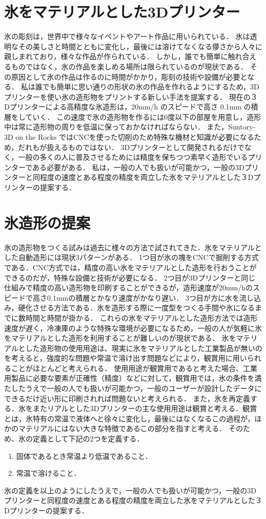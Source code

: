 \section{氷をマテリアルとした3Dプリンター}
\label{sec:paragraph}

氷の彫刻は，世界中で様々なイベントやアート作品に用いられている．
氷は透明なその美しさと時間とともに変化し，最後には溶けてなくなる儚さから人々に親しまれており，様々な作品が作られている．
しかし，誰でも簡単に触れ合えるものではなく，氷の作品を楽しめる場所は限られているのが現状である．
その原因として氷の作品は作るのに時間がかかり，彫刻の技術や設備が必要となる．
私は誰でも簡単に思い通りの形状の氷の作品を作れるようにするため，3Dプリンターを使い氷の造形物をプリントする新しい手法を提案する．
現在の３Dプリンターによる高精度な氷造形は，20mm/h のスピードで高さ 0.1mm の積層をしていく．
この速度で氷の造形物を作るには0度以下の部屋を用意し，造形中は常に造形物の周りを低温に保っておかなければならない．
また，Suntory-3D on the Rocks \cite{b} ではCNCを使った切削のため特殊な機材と知識が必要になるため，だれもが扱えるものではない．
3Dプリンターとして開発されるだけでなく，一般の多くの人に普及させるためには精度を保ちつつ素早く造形でいるプリンターである必要がある．
私は，一般の人でも扱いが可能かつ，一般の3Dプリンターと同程度の速度とある程度の精度を両立した氷をマテリアルとした３Dプリンターの提案する．

\section{氷造形の提案}
\label{sec:enum}

氷の造形物をつくる試みは過去に様々の方法で試されてきた．氷をマテリアルとした自動造形には現状3パターンがある．
1つ目が氷の塊をCNCで掘削する方式である．CNC方式では，精度の高い氷をマテリアルとした造形を行おうことができるのだが，特殊な設備と技術が必要になる．
2つ目が3Dプリンターと同じ仕組みで精度の高い造形物を印刷することができるが，造形速度が20mm/hのスピードで高さ0.1mmの積層とかなり速度がかなり遅い．
3つ目が方に水を流し込み，硬化させる方法である．氷を造形する際に一度型をつくる手間や氷になるまでに数時間と時間が掛かる．
これらの氷をマテリアルとした造形方法では造形速度が遅く，冷凍庫のような特殊な環境が必要になるため，一般の人が気軽に氷をマテリアルとした造形を利用することが難しいのが現状である．
氷をマテリアルとした造形物の使用用途は、現実に氷をマテリアルとした工業製品が無いのを考えると，強度的な問題や常温で溶け出す問題などにより，観賞用に用いられることがほとんどと考えられる．
使用用途が観賞用であると考えた場合、工業用製品に必要な要素が正確性（精度）などに対して，観賞用では，氷の条件を満たしたうえで一般の人でも扱いが可能かつ，一般のユーザーが設計したデータにできるだけ近い形に印刷されれば問題ないと考えられる．
また，氷を再定義する．氷をまたリアルとした3Dプリンターの主な使用用途は観賞と考える．観賞とは，氷特有の常温で液体へと徐々に変化し，最後にはなくなるこの過程が，ほかのマテリアルにはない大きな特徴であるこの部分を指すと考える．
そのため、氷の定義として下記の2つを定義する．

\begin{enumerate}
  \item 固体であるとき常温より低温であること． 
  \item 常温で溶けること．
 \end{enumerate}

氷の定義を以上のようにしたうえで，一般の人でも扱いが可能かつ，一般の3Dプリンターと同程度の速度とある程度の精度を両立した氷をマテリアルとした３Dプリンターの提案する．

